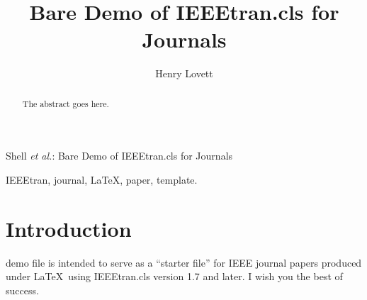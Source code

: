 \documentclass[journal]{IEEEtran}
\begin{document}
\title{Bare Demo of IEEEtran.cls for Journals}
%
%
%

\author{Henry Lovett}

%
{Shell \MakeLowercase{\textit{et al.}}: Bare Demo of IEEEtran.cls for Journals}
% 


\maketitle


\begin{abstract}
The abstract goes here.
\end{abstract}

\begin{IEEEkeywords}
IEEEtran, journal, \LaTeX, paper, template.
\end{IEEEkeywords}






%
\IEEEpeerreviewmaketitle



\section{Introduction}
% 
% 
 demo file is intended to serve as a ``starter file''
for IEEE journal papers produced under \LaTeX\ using
IEEEtran.cls version 1.7 and later.
I wish you the best of success.
\end{document}
